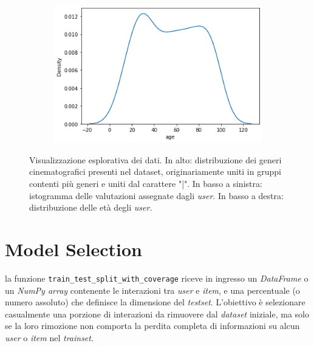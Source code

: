 \begin{figure}[H]
\begin{subfigure}[b]{0.49\textwidth}
    \end{subfigure}
    \hfill
    \begin{subfigure}[b]{0.49\textwidth}
        \includegraphics[width=\textwidth]{figures/visualization/output3.png}
    \end{subfigure}

    \caption{Visualizzazione esplorativa dei dati. In alto: distribuzione dei generi cinematografici presenti nel dataset, originariamente uniti in gruppi contenti più generi e uniti dal carattere "|". In basso a sinistra: istogramma delle valutazioni assegnate dagli \textit{user}. In basso a destra: distribuzione delle età degli \textit{user}.}
\end{figure}

\section{Model Selection}

la funzione \texttt{train\_test\_split\_with\_coverage} riceve in ingresso un \textit{DataFrame} o un \textit{NumPy array} contenente le interazioni tra \textit{user} e \textit{item}, e una percentuale (o numero assoluto) che definisce la dimensione del \textit{testset}. L'obiettivo è selezionare casualmente una porzione di interazioni da rimuovere dal \textit{dataset} iniziale, ma solo se la loro rimozione non comporta la perdita completa di informazioni su alcun \textit{user} o \textit{item} nel \textit{trainset}.

